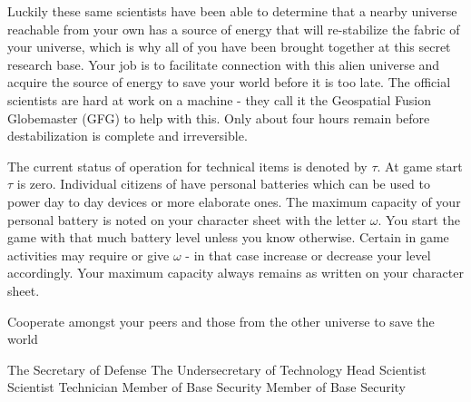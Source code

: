 \documentclass[blue]{guildcamp3}
\begin{document}
Luckily these same scientists have been able to determine that a nearby universe reachable from your own has a source of energy that will re-stabilize the fabric of your universe, which is why all of you have been brought together at this secret research base. Your job is to facilitate connection with this alien universe and acquire the source of energy to save your world before it is too late. The official scientists are hard at work on a machine - they call it the Geospatial Fusion Globemaster (GFG) to help with this. Only about four hours remain before destabilization is complete and irreversible.

The current status of operation for technical items is denoted by $\tau$. At game start $\tau$ is zero. Individual citizens of \bTechWorld{} have personal batteries which can be used to power day to day devices or more elaborate ones. The maximum capacity of your personal battery is noted on your character sheet with the letter $\omega$. You start the game with that much battery level unless you know otherwise. Certain in game activities may require or give $\omega$ - in that case increase or decrease your level accordingly. Your maximum capacity always remains as written on your character sheet. 

\begin{itemz}[Goals]
	\item Cooperate amongst your peers and those from the other universe to save the world
\end{itemz}


\begin{members}
	\member{\cPoliOne{}} The Secretary of Defense
	\member{\cPoliTwo{}} The Undersecretary of Technology
	\member{\cSciOne{}} Head Scientist
	\member{\cSciTwo{}} Scientist
	\member{\cTech{}} Technician
	\member{\cSpecOpOne{}} Member of Base Security
	\member{\cSpecOpTwo{}} Member of Base Security
\end{members}
\end{document}
